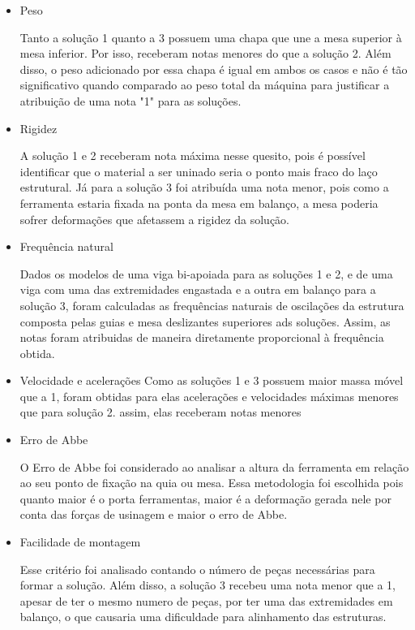 \begin{itemize}
    \item Peso
    
    Tanto a solução 1 quanto a 3 possuem uma chapa que une a mesa superior à mesa inferior. Por isso, receberam notas menores do que a solução 2. Além disso, o peso adicionado por essa chapa é igual em ambos os casos e não é tão significativo quando comparado ao peso total da máquina para justificar a atribuição de uma nota "1" para as soluções. 
    
    \item Rigidez
    
    A solução 1 e 2 receberam nota máxima nesse quesito, pois é possível identificar que o material a ser uninado seria o ponto mais fraco do laço estrutural. Já para a solução 3 foi atribuída uma nota menor, pois como a ferramenta estaria fixada na ponta da mesa em balanço, a mesa poderia sofrer deformações que afetassem a rigidez da solução.
    
    \item Frequência natural
    
    Dados os modelos de uma viga bi-apoiada para as soluções 1 e 2, e de uma viga com uma das extremidades engastada e a outra em balanço para a solução 3, foram calculadas as frequências naturais de oscilações da estrutura composta pelas guias e mesa deslizantes superiores ads soluções. Assim, as notas foram atribuidas de maneira diretamente proporcional à frequência obtida. 
    
    \item Velocidade e acelerações
    Como as soluções 1 e 3 possuem maior massa móvel que a 1, foram obtidas para elas acelerações e velocidades máximas menores que para solução 2. assim, elas receberam notas menores
    
    \item Erro de Abbe
    
    O Erro de Abbe foi considerado ao analisar a altura da ferramenta em relação ao seu ponto de fixação na quia ou mesa. Essa metodologia foi escolhida pois quanto maior é o porta ferramentas, maior é a deformação gerada nele por conta das forças de usinagem e maior o erro de Abbe.
    
    \item Facilidade de montagem
    
    Esse critério foi analisado contando o número de peças necessárias para formar a solução. Além disso, a solução 3 recebeu uma nota menor que a 1, apesar de ter o mesmo numero de peças, por ter uma das extremidades em balanço, o que causaria uma dificuldade para alinhamento das estruturas.
    

\end{itemize}
